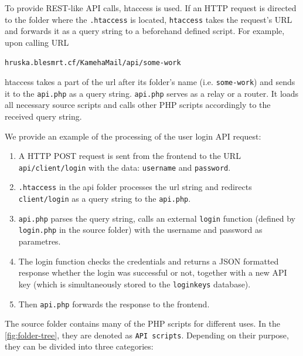 To provide REST-like API calls, htaccess is used. If an HTTP request is directed to the folder where the \texttt{.htaccess} is located, \texttt{htaccess} takes the request's URL and forwards it as a query string to a beforehand defined script. For example, upon calling URL
\begin{center}
\texttt{hruska.blesmrt.cf/KamehaMail/api/some-work}
\end{center}
htaccess takes a part of the url after its folder's name (i.e. \texttt{some-work}) and sends it to the \texttt{api.php} as a query string. \texttt{api.php} serves as a relay or a router. It loads all necessary source scripts and calls other PHP scripts accordingly to the received query string.

We provide an example of the processing of the user login API request:
\begin{enumerate}
\item  A HTTP POST request is sent from the frontend to the URL\\\texttt{api/client/login} with the data: \texttt{username} and \texttt{password}.
\item \texttt{.htaccess} in the api folder processes the url string and redirects\\\texttt{client/login} as a query string to the \texttt{api.php}.
\item \texttt{api.php} parses the query string, calls an external \texttt{login} function (defined by \texttt{login.php} in the source folder) with the username and password as parametres.
\item The login function checks the credentials and returns a JSON formatted response whether the login was successful or not, together with a new API key (which is simultaneously stored to the \texttt{loginkeys} database).
\item Then \texttt{api.php} forwards the response to the frontend.
\end{enumerate}

The source folder contains many of the PHP scripts for different uses. In the \autoref{fig:folder-tree}, they are denoted as \texttt{API scripts}. Depending on their purpose, they can be divided into three categories:

